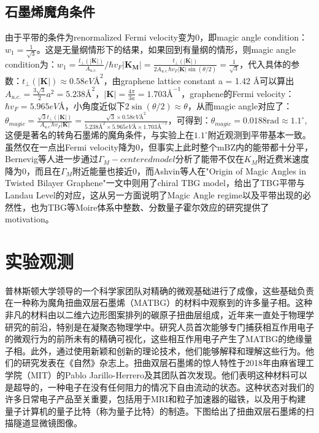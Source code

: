 \documentclass[hyperref,a4paper,UTF8]{ctexart}
\begin{document}
\subsection{石墨烯魔角条件}
由于平带的条件为renormalized Fermi velocity变为0，即magic angle condition：$w_1 = \frac{1}{\sqrt{3}}$。这是无量纲情形下的结果，如果回到有量纲的情形，则magic angle condition为：$w_1 = \frac{t_\perp (|\mathbf{K}|)}{A_{u.c.}} / \hbar v_F |\mathbf{K_M}| = \frac{t_\perp (|\mathbf{K}|)}{2 A_{u.c.} \hbar v_F |\mathbf{K}| \sin(\theta/2)} = \frac{1}{\sqrt{3}}$，代入具体的参数：$t_\perp (|\mathbf{K}|) \approx 0.58 eV Å ^2$，由graphene lattice constant a = 1.42 Å可以算出$A_{u.c.} = \frac{3\sqrt{3}}{2}a^2 = 5.238 Å^2$，$|\mathbf{K}| = \frac{4\pi}{3a} = 1.703 Å^{-1}$，graphene的Fermi velocity：$\hbar v_F = 5.965 eV Å$，小角度近似下$2\sin(\theta/2) \approx \theta$，从而magic angle对应了：$\theta_{magic} = \frac{\sqrt{3}t_\perp (|\mathbf{K}|)}{A_{u.c.}\hbar v_F |\mathbf{K}|} = \frac{\sqrt{3} \times 0.58 eV Å^2}{5.238 Å^2 \times 5.965 eV Å \times 1.703 Å^{-1}}$，可得到：$\theta_{magic} = 0.0188 \text{rad} \approx 1.1^\circ$,这便是著名的转角石墨烯的魔角条件，与实验上在$1.1^\circ$附近观测到平带基本一致。虽然仅在一点出Fermi velocity降为0，但事实上此时整个mBZ内的能带都十分平，Bernevig等人进一步通过$\Gamma_M-centered model$分析了能带不仅在$K_M$附近费米速度降为0，而且在$\Gamma_M$附近能量也接近0，而Ashvin等人在"Origin of Magic Angles in Twisted Bilayer Graphene"一文中则用了chiral TBG model，给出了TBG平带与Landau Level的对应，这从另一方面说明了Magic Angle regime以及平带出现的必然性，也为TBG等Moire体系中整数、分数量子霍尔效应的研究提供了motivation。
\
\section{实验观测}
普林斯顿大学领导的一个科学家团队对精确的微观基础进行了成像，这些基础负责在一种称为魔角扭曲双层石墨烯（MATBG）的材料中观察到的许多量子相。这种非凡的材料由以二维六边形图案排列的碳原子扭曲层组成，近年来一直处于物理学研究的前沿，特别是在凝聚态物理学中。研究人员首次能够专门捕获相互作用电子的微观行为的前所未有的精确可视化，这些相互作用电子产生了MATBG的绝缘量子相。此外，通过使用新颖和创新的理论技术，他们能够解释和理解这些行为。他们的研究发表在《自然》杂志上。扭曲双层石墨烯的惊人特性于2018年由麻省理工学院（MIT）的Pablo Jarillo-Herrero及其团队首次发现。他们表明这种材料可以是超导的，一种电子在没有任何阻力的情况下自由流动的状态。这种状态对我们的许多日常电子产品至关重要，包括用于MRI和粒子加速器的磁铁，以及用于构建量子计算机的量子比特（称为量子比特）的制造。下图给出了扭曲双层石墨烯的扫描隧道显微镜图像。
\end{document}
